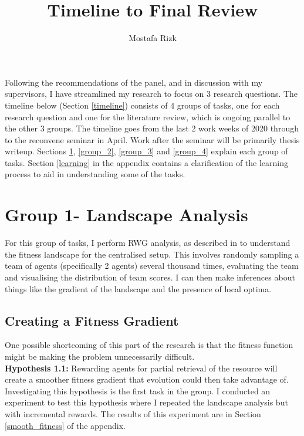 \documentclass[12pt]{article}
\title{Timeline to Final Review}
\author{Mostafa Rizk}
\begin{document}
\maketitle

Following the recommendations of the panel, and in discussion with my supervisors, I have streamlined my research to focus on 3 research questions. The timeline below (Section \ref{timeline}) consists of 4 groups of tasks, one for each research question and one for the literature review, which is ongoing parallel to the other 3 groups. 
The timeline goes from the last 2 work weeks of 2020 through to the reconvene seminar in April. 
Work after the seminar will be primarily thesis writeup. 
Sections \ref{group_1}, \ref{group_2}, \ref{group_3} and \ref{group_4} explain each group of tasks.
Section \ref{learning} in the appendix contains a clarification of the learning process to aid in understanding some of the tasks.

\section{Group 1- Landscape Analysis}\label{group_1}

For this group of tasks, I perform RWG analysis, as described in \cite{oller:AAMAS:2020}  to understand the fitness landscape for the centralised setup. 
This involves randomly sampling a team of agents (specifically 2 agents) several thousand times, evaluating the team and visualising the distribution of team scores. 
I can then make inferences about things like the gradient of the landscape and the presence of local optima.

\subsection{Creating a Fitness Gradient}

One possible shortcoming of this part of the research is that the fitness function might be making the problem unnecessarily difficult.\\

\textbf{Hypothesis 1.1:} Rewarding agents for partial retrieval of the resource will create a smoother fitness gradient that evolution could then take advantage of.\\

Investigating this hypothesis is the first task in the group.
I conducted an experiment to test this hypothesis where I repeated the landscape analysis but with incremental rewards.
The results of this experiment are in Section \ref{smooth_fitness} of the appendix.
\end{document}
